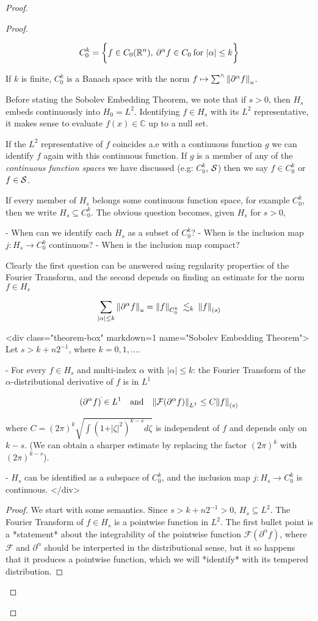 \documentclass[../main-manifolds.tex]{subfiles}
\begin{document}
{{\begin{proof}
{{\begin{proof}
\begin{definition}
$$
C_{0}^{k} = \biggl\{{f\in C_0({\mathbb{R}^n}),\: \partial^{\alpha}f \in C_0\:\text{for }\vert\alpha\vert\leq k}\biggr\}
$$

If $k$ is finite, $C_0^k$ is a Banach space with the norm $f\mapsto \sum^{\wedge}\norm{\partial^\alpha f}_u$.

\end{definition}


Before stating the Sobolev Embedding Theorem, we note that if $s>0$, then $H_s$ embeds continuously into $H_0 = L^2$. Identifying $f\in H_s$ with its $L^2$ representative, it makes sense to evaluate $f(x)\in\mathbb{C}$ up to a null set.

If the $L^2$ representative of $f$ coincides a.e with a continuous function $g$ we can identify $f$ again with this continuous function. If $g$ is a member of any of the \emph{continuous function spaces} we have discussed (e.g: $C_0^k$, $\mathcal{S}$) then we say $f\in C^{k}_0$ or $f\in \mathcal{S}$.

If every member of $H_s$ belongs some continuous function space, for example $C_0^k$, then we write $H_s\subseteq C_0^k$. The obvious question becomes, given $H_s$ for $s>0$, 

- When can we identify each $H_s$ as a subset of $C_0^k$?
- When is the inclusion map $j: H_s\to C_0^k$ continuous? 
- When is the inclusion map compact?

Clearly the first question can be answered using regularity properties of the Fourier Transform, and the second depends on finding an estimate for the norm $f\in H_s$

$$
\sum_{\vert\alpha\vert\leq k} \norm{\partial^{\alpha} f}_u= \norm{f}_{C_0^k}\: \lesssim_{k}\: \norm{f}_{(s)}
$$

<div class="theorem-box" markdown=1 name="Sobolev Embedding Theorem">
Let $s > k + n2^{-1}$, where $k = 0, 1,\ldots$.

- For every $f\in H_s$ and multi-index $\alpha$ with $\vert\alpha\vert\leq k$: the Fourier Transform of the $\alpha$-distributional derivative of $f$ is in $L^1$ 

    $$
    (\partial^\alpha f)^{\hat{ }}\in L^1\quad\text{and}\quad \norm{\mathcal{F}(\partial^\alpha f)}_{L^1}\leq C\norm{f}_{(s)}
    $$

    where $C=(2\pi)^k\sqrt{\int (1+\vert\zeta\vert^2)^{k-s}d\zeta}$ is independent of $f$ and depends only on $k-s$. (We can obtain a sharper estimate by replacing the factor $(2\pi)^k$ with $(2\pi)^{k-s}$).

- $H_s$ can be identified as a subspace of $C_0^k$, and the inclusion map $j: H_s\to C_0^k$ is continuous.
</div>
\begin{proof}
We start with some semantics. Since $s>k+n2^{-1}>0$, $H_s\subseteq L^2$. The Fourier Transform of $f\in H_s$ is a pointwise function in $L^2$. The first bullet point is a *statement* about the integrability of the pointwise function $\mathcal{F}(\partial^\alpha f)$, where $\mathcal{F}$ and $\partial^\alpha$ should be interperted in the distributional sense, but it so happens that it produces a pointwise function, which we will *identify* with its tempered distribution.


\end{proof}
\end{proof}}}
\end{proof}}}
\end{document}
